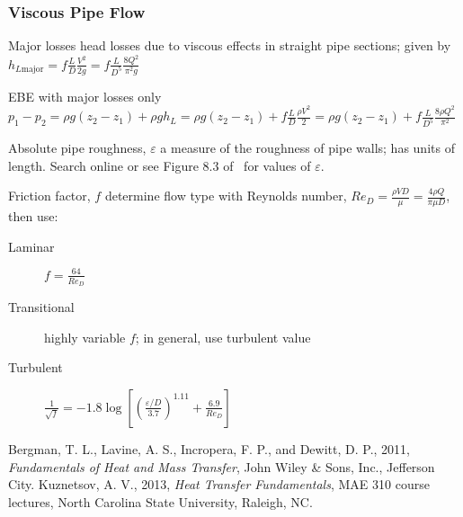 \documentclass{article}
\begin{document}
\subsubsection{Viscous Pipe Flow}
\begin{description*}
\item[Major losses] head losses due to viscous effects in straight pipe sections; given by
  \(h_{L\mathrm{major}} = f\frac{L}{D}\frac{V^2}{2g} = f\frac{L}{D^5}\frac{8Q^2}{\pi^2g}\)
\item[EBE with major losses only]
  \(p_1-p_2 = \rho{}g(z_2-z_1)+\rho{}gh_L = \rho{}g(z_2-z_1) + f\frac{L}{D}\frac{\rho{}V^2}{2}
  = \rho{}g(z_2-z_1) + f\frac{L}{D^5}\frac{8\rho{}Q^2}{\pi^2}\)
\item[Absolute pipe roughness, $\varepsilon$] a measure of the roughness of pipe walls; has units of
  length. Search online or see Figure 8.3 of~\cite{hamt} for values of $\varepsilon$.
\item[Friction factor, $f$] determine flow type with Reynolds number,
  \(\mathit{Re}_D = \frac{\rho{}VD}{\mu} = \frac{4\rho{}Q}{\pi\mu{}D}\), then use:
  \begin{description}
  \item[Laminar]
    \(f = \frac{64}{\mathit{Re}_D}\)
  \item[Transitional]
    highly variable $f$; in general, use turbulent value
  \item[Turbulent]
    \(\frac{1}{\sqrt{f}}
    = -1.8\log\left[\left(\frac{\varepsilon/D}{3.7}\right)^{1.11}
      + \frac{6.9}{\mathit{Re}_D}\right]\)
  \end{description}
\end{description*}

\begin{thebibliography}{99}
 Bergman, T. L., Lavine, A. S., Incropera, F. P., and Dewitt, D. P., 2011,
  \emph{Fundamentals of Heat and Mass Transfer}, John Wiley \& Sons, Inc., Jefferson City.
 Kuznetsov, A. V., 2013, \emph{Heat Transfer Fundamentals}, MAE 310 course lectures,
  North Carolina State University, Raleigh, NC.
\end{thebibliography}
\end{document}
